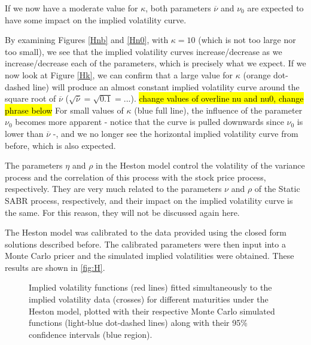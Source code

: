 If we now have a moderate value for $\kappa$, both parameters $\overline{\nu}$ and $\nu_0$ are expected to have some impact on the implied volatility curve.

By examining Figures \autoref{Hnb} and \autoref{Hn0}, with $\kappa=10$ (which is not too large nor too small), we see that the implied volatility curves increase/decrease as we increase/decrease each of the parameters, which is precisely what we expect.
If we now look at Figure \autoref{Hk}, we can confirm that a large value for $\kappa$ (orange dot-dashed line) will produce an almost constant implied volatility curve around the square root of $\overline{\nu}$ ($\sqrt{\overline{\nu}}=\sqrt{0.1}=...$).
\hl{change values of overline nu and nu0, change phrase below}
For small values of $\kappa$ (blue full line), the influence of the parameter $\nu_0$ becomes more apparent - notice that the curve is pulled downwards since $\nu_0$ is lower than $\overline{\nu}$ -, and we no longer see the horizontal implied volatility curve from before, which is also expected.

The parameters $\eta$ and $\rho$ in the Heston model control the volatility of the variance process and the correlation of this process with the stock price process, respectively. They are very much related to the parameters $\nu$ and $\rho$ of the Static SABR process, respectively, and their impact on the implied volatility curve is the same. For this reason, they will not be discussed again here.


The Heston model was calibrated to the data provided using the closed form solutions described before. The calibrated parameters were then input into a Monte Carlo pricer and the simulated implied volatilities were obtained. These results are shown in \autoref{fig:H}.

\begin{figure}[H]
  \begin{subfigmatrix}{2}
  \end{subfigmatrix}
  \caption[Implied volatility functions fitted simultaneously to the implied volatility data for different maturities under the Heston model, plotted with their respective Monte Carlo simulated functions along with their 95\% confidence intervals.]{Implied volatility functions (red lines) fitted simultaneously to the implied volatility data (crosses) for different maturities under the Heston model, plotted with their respective Monte Carlo simulated functions (light-blue dot-dashed lines) along with their 95\% confidence intervals (blue region).}
  \label{fig:H}
\end{figure}

